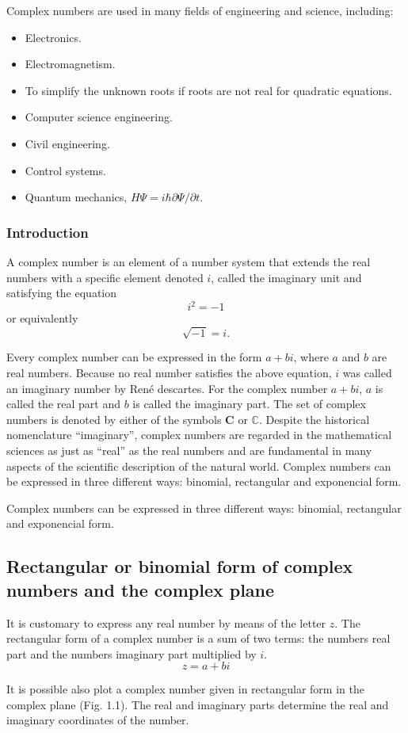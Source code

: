 Complex numbers are used in many fields of engineering and science, including:
\begin{itemize}
\item Electronics.
\item Electromagnetism.
\item To simplify the unknown roots if roots are not real for quadratic equations.
\item Computer science engineering.
\item Civil engineering.
\item Control systems.
\item Quantum mechanics, $H \Psi = i \hbar \partial \Psi / \partial t$.
\end{itemize}

\subsubsection{Introduction}

A complex number is an element of a number system that extends the real numbers  with  a  specific  element  denoted  $i$,  called  the  imaginary  unit  and satisfying the equation
\begin{equation}
    i^2 = -1
\end{equation}
or equivalently
\begin{equation}
    \sqrt{-1} = i.
\end{equation}

Every complex number can be expressed in the form $a + b i$, where $a$ and $b$ are real numbers. Because no real number satisfies the above equation, $i$ was called an imaginary number by René descartes. For the complex number $a + b i$,  $a$ is called the real  part and $b$ is  called the imaginary  part.  The set  of complex numbers  is  denoted  by  either  of  the  symbols $\mathbf{C}$ or $\mathbb{C}$. Despite  the  historical nomenclature ``imaginary'', complex numbers are regarded in the mathematical sciences as just as ``real'' as the real numbers and are fundamental in many aspects of the scientific description of the natural world. Complex  numbers  can  be  expressed  in  three  different  ways:  binomial, rectangular and exponencial form.

Complex  numbers  can  be  expressed  in  three  different  ways:  binomial, rectangular and exponencial form.

\subsection{Rectangular or binomial form of complex numbers and the complex plane}

It  is  customary  to  express  any  real  number  by  means  of  the  letter  $z$.  The rectangular form of a complex number is a sum of two terms: the number\textquotesingle s real part and the number\textquotesingle s imaginary part multiplied by $i$.
\begin{equation}
    z = a + b i
\end{equation}

It  is  possible also plot  a  complex  number given in  rectangular form in  the complex plane (Fig. 1.1). The real and imaginary parts determine the real and imaginary coordinates of the number.
